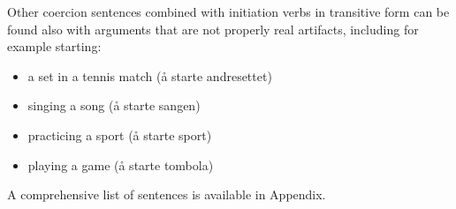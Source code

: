\documentclass{article}
\begin{document}
Other coercion sentences combined with initiation verbs in transitive form can be found also with arguments that are not properly real artifacts, including for example starting:
\begin{itemize}
    \item  a set in a tennis match (å starte andresettet) 
    \item  singing a song (å starte sangen)
    \item  practicing a sport (å starte sport)
    \item  playing a game (å starte tombola)
\end{itemize}
A comprehensive list of sentences is available in Appendix. 

% 




\end{document}
